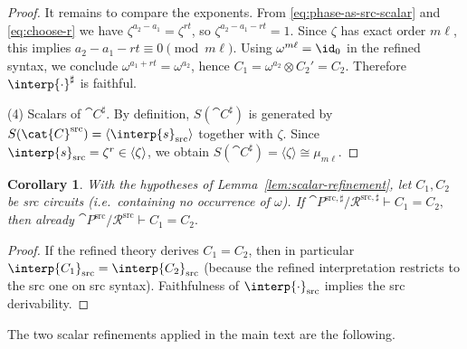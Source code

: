\documentclass[10pt,a4paper]{article}
\newtheorem{corollary}[theorem]{Corollary}
\def\cref#1{Lemma~\ref{#1}}%
\begin{document}
\begin{proof}
It remains to compare the exponents.  From \eqref{eq:phase-as-src-scalar} and \eqref{eq:choose-r} we have
$\zeta^{a_2-a_1}=\zeta^{rt}$, so $\zeta^{a_2-a_1-rt}=1$.  Since $\zeta$ has exact order $m\ell$, this implies
\(
  a_2-a_1-rt \equiv 0 \pmod{m\ell}.
\)
Using $\omega^{m\ell}=\id_0$ in the refined syntax, we conclude $\omega^{a_1+rt}=\omega^{a_2}$, hence
\(
  C_1=\omega^{a_2}\otimes C_2' = C_2.
\)
Therefore $\interp{\cdot}^{\sharp}$ is faithful.

(4) Scalars of $ \cat{C}^{\sharp}$.
By definition, $S( \cat{C}^{\sharp})$ is generated by $S( \cat{C}^{\mathrm{src}})=\langle \interp{s}_{\mathrm{src}}\rangle$
together with $\zeta$.  Since $\interp{s}_{\mathrm{src}}=\zeta^r\in\langle \zeta\rangle$, we obtain
$S( \cat{C}^{\sharp})=\langle \zeta\rangle\cong \mu_{m\ell}$.
\end{proof}

\begin{corollary}\label{cor:scalar-refinement-conservative}
With the hypotheses of \cref{lem:scalar-refinement}, let $C_1,C_2$ be \emph{src} circuits
(i.e.\ containing no occurrence of $\omega$).  If
\(
  \cat{P}^{\mathrm{src},\sharp}/\mathcal{R}^{\mathrm{src},\sharp}\vdash C_1=C_2,
\)
then already
\(
  \cat{P}^{\mathrm{src}}/\mathcal{R}^{\mathrm{src}}\vdash C_1=C_2.
\)
\end{corollary}
\begin{proof}
If the refined theory derives $C_1=C_2$, then in particular $\interp{C_1}_{\mathrm{src}}=\interp{C_2}_{\mathrm{src}}$
(because the refined interpretation restricts to the src one on src syntax).  Faithfulness of
$\interp{\cdot}_{\mathrm{src}}$ implies the src derivability.
\end{proof}


The two scalar refinements applied in the main text are the following.
\end{document}
